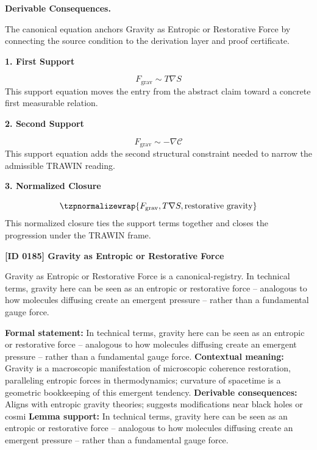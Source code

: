\par\vspace{0.35em}
\noindent\textbf{Derivable Consequences.}\quad
\begingroup
\footnotesize
\raggedright
The canonical equation anchors Gravity as Entropic or Restorative Force by connecting the source condition to the derivation layer and proof certificate.
\par\endgroup

\noindent\textbf{1. First Support}\par
\[
F_{\mathrm{grav}} \sim T\nabla S
\]
\noindent This support equation moves the entry from the abstract claim toward a concrete first measurable relation.\par
\noindent\textbf{2. Second Support}\par
\[
F_{\mathrm{grav}} \sim -\nabla \mathcal{C}
\]
\noindent This support equation adds the second structural constraint needed to narrow the admissible TRAWIN reading.\par
\noindent\textbf{3. Normalized Closure}\par
\[
\tzpnormalizewrap{F_{\mathrm{grav}},T\nabla S,\text{restorative gravity}}
\]
\noindent This normalized closure ties the support terms together and closes the progression under the TRAWIN frame.\par

\clearpage
\noindent\textbf{[ID 0185] Gravity as Entropic or Restorative Force}\par
\vspace{0.35em}
\begingroup\small
{}
Gravity as Entropic or Restorative Force is a canonical-registry. In technical terms, gravity here can be seen as an entropic or restorative force -- analogous to how molecules diffusing create an emergent pressure -- rather than a fundamental gauge force.

\begingroup\footnotesize\setlength{\emergencystretch}{3em}\sloppy
\textbf{Formal statement:} In technical terms, gravity here can be seen as an entropic or restorative force -- analogous to how molecules diffusing create an emergent pressure -- rather than a fundamental gauge force.
\textbf{Contextual meaning:} Gravity is a macroscopic manifestation of microscopic coherence restoration, paralleling entropic forces in thermodynamics; curvature of spacetime is a geometric bookkeeping of this emergent tendency.  
\textbf{Derivable consequences:} Aligns with entropic gravity theories; suggests modifications near black holes or cosmi
\textbf{Lemma support:} In technical terms, gravity here can be seen as an entropic or restorative force -- analogous to how molecules diffusing create an emergent pressure -- rather than a fundamental gauge force.\par
\endgroup

